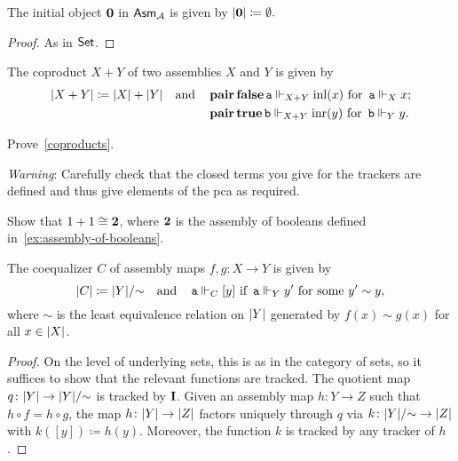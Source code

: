 \begin{proposition}
  The initial object \(\mathbf 0\) in \(\mathsf{Asm}_{\mathcal A}\) is given by
  \(
    \lvert\mathbf 0\rvert \coloneq \emptyset.
  \)
\end{proposition}
\begin{proof}
  As in \(\mathsf{Set}\).
\end{proof}

\begin{proposition}[Coproducts]\label{coproducts}
  The coproduct \(X + Y\) of two assemblies \(X\) and \(Y\) is given by
  \begin{align*}
    \lvert X + Y\rvert \coloneq \lvert X\rvert + \lvert Y\rvert
    \quad\text{and}\quad
    &\operatorname{\mathbf{pair}}\operatorname{\mathbf{false}}\operatorname{\mathtt{a}} \Vdash_{X + Y} \operatorname{inl}(x)
      \text{ for } \operatorname{\mathtt{a}} \Vdash_X x;
    \\
    &\operatorname{\mathbf{pair}}\operatorname{\mathbf{true}}\operatorname{\mathtt{b}} \Vdash_{X + Y} \operatorname{inr}(y)
    \text{ for }
    \operatorname{\mathtt{b}} \Vdash_Y y.
  \end{align*}
\end{proposition}
\begin{exercise}\label{exer:coproducts}
  Prove~\cref{coproducts}.

  \emph{Warning}: Carefully check that the closed terms you give for the
  trackers are defined and thus give elements of the pca as required.
\end{exercise}

\begin{exercise}\label{exer:coproduct-booleans}
  Show that \({1 + 1} \cong \mathbf 2\), where \(\mathbf 2\) is the assembly of booleans
  defined in~\cref{ex:assembly-of-booleans}.
\end{exercise}


\begin{proposition}[Coequalizers]
  The coequalizer \(C\) of assembly maps \(f,g \colon X \to Y\) is given by
  \[
    \lvert C\rvert \coloneq \lvert Y\rvert/{\sim}
    \quad\text{and}\quad
    \operatorname{\mathtt{a}} \Vdash_C [y] \text{ if } \operatorname{\mathtt{a}} \Vdash_Y y'
    \text{ for some } {y'} \sim y,
  \]
  where \({\sim}\) is the least equivalence relation on \(\lvert Y\rvert\)
  generated by \(f(x) \sim g(x)\) for all \(x \in \lvert X\rvert\).
\end{proposition}
\begin{proof}
  On the level of underlying sets, this is as in the category of sets, so it
  suffices to show that the relevant functions are tracked.
  The quotient map \(q \colon \lvert Y\rvert \to \lvert Y\rvert/{\sim}\) is tracked by
  \(\operatorname{\mathbf{I}}\).
  Given an assembly map \(h \colon Y \to Z\) such that
  \(h \circ f = h \circ g\), the map \(h \colon \lvert Y\rvert \to \lvert Z\rvert\)
  factors uniquely through \(q\) via
  \(k \colon \lvert Y\rvert/{\sim} \to \lvert Z\rvert\) with \(k([y]) \coloneq h(y)\).
  Moreover, the function \(k\) is tracked by any tracker of \(h\).
\end{proof}

